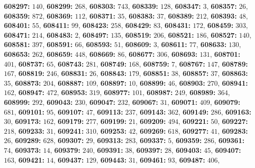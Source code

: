 \textsf{\bfseries 608297:} $140$, \textsf{\bfseries 608299:} $268$, \textsf{\bfseries 608303:} $743$, \textsf{\bfseries 608339:} $128$, \textsf{\bfseries 608347:} $3$, \textsf{\bfseries 608357:} $26$, \textsf{\bfseries 608359:} $872$, \textsf{\bfseries 608369:} $112$, \textsf{\bfseries 608371:} $35$, \textsf{\bfseries 608383:} $37$, \textsf{\bfseries 608389:} $212$, \textsf{\bfseries 608393:} $48$, \textsf{\bfseries 608401:} $55$, \textsf{\bfseries 608411:} $99$, \textsf{\bfseries 608423:} $258$, \textsf{\bfseries 608429:} $83$, \textsf{\bfseries 608431:} $172$, \textsf{\bfseries 608459:} $303$, \textsf{\bfseries 608471:} $214$, \textsf{\bfseries 608483:} $2$, \textsf{\bfseries 608497:} $135$, \textsf{\bfseries 608519:} $206$, \textsf{\bfseries 608521:} $186$, \textsf{\bfseries 608527:} $140$, \textsf{\bfseries 608581:} $397$, \textsf{\bfseries 608591:} $66$, \textsf{\bfseries 608593:} $51$, \textsf{\bfseries 608609:} $3$, \textsf{\bfseries 608611:} $77$, \textsf{\bfseries 608633:} $130$, \textsf{\bfseries 608653:} $262$, \textsf{\bfseries 608659:} $448$, \textsf{\bfseries 608669:} $86$, \textsf{\bfseries 608677:} $306$, \textsf{\bfseries 608693:} $131$, \textsf{\bfseries 608701:} $401$, \textsf{\bfseries 608737:} $65$, \textsf{\bfseries 608743:} $281$, \textsf{\bfseries 608749:} $168$, \textsf{\bfseries 608759:} $7$, \textsf{\bfseries 608767:} $147$, \textsf{\bfseries 608789:} $167$, \textsf{\bfseries 608819:} $246$, \textsf{\bfseries 608831:} $26$, \textsf{\bfseries 608843:} $179$, \textsf{\bfseries 608851:} $38$, \textsf{\bfseries 608857:} $37$, \textsf{\bfseries 608863:} $35$, \textsf{\bfseries 608873:} $204$, \textsf{\bfseries 608887:} $109$, \textsf{\bfseries 608897:} $10$, \textsf{\bfseries 608899:} $46$, \textsf{\bfseries 608903:} $270$, \textsf{\bfseries 608941:} $162$, \textsf{\bfseries 608947:} $472$, \textsf{\bfseries 608953:} $319$, \textsf{\bfseries 608977:} $101$, \textsf{\bfseries 608987:} $249$, \textsf{\bfseries 608989:} $364$, \textsf{\bfseries 608999:} $292$, \textsf{\bfseries 609043:} $230$, \textsf{\bfseries 609047:} $232$, \textsf{\bfseries 609067:} $31$, \textsf{\bfseries 609071:} $409$, \textsf{\bfseries 609079:} $681$, \textsf{\bfseries 609101:} $95$, \textsf{\bfseries 609107:} $47$, \textsf{\bfseries 609113:} $237$, \textsf{\bfseries 609143:} $362$, \textsf{\bfseries 609149:} $286$, \textsf{\bfseries 609163:} $30$, \textsf{\bfseries 609173:} $162$, \textsf{\bfseries 609179:} $277$, \textsf{\bfseries 609199:} $21$, \textsf{\bfseries 609209:} $494$, \textsf{\bfseries 609221:} $50$, \textsf{\bfseries 609227:} $218$, \textsf{\bfseries 609233:} $31$, \textsf{\bfseries 609241:} $310$, \textsf{\bfseries 609253:} $42$, \textsf{\bfseries 609269:} $618$, \textsf{\bfseries 609277:} $41$, \textsf{\bfseries 609283:} $26$, \textsf{\bfseries 609289:} $628$, \textsf{\bfseries 609307:} $29$, \textsf{\bfseries 609313:} $283$, \textsf{\bfseries 609337:} $5$, \textsf{\bfseries 609359:} $286$, \textsf{\bfseries 609361:} $74$, \textsf{\bfseries 609373:} $14$, \textsf{\bfseries 609379:} $240$, \textsf{\bfseries 609391:} $38$, \textsf{\bfseries 609397:} $28$, \textsf{\bfseries 609403:} $45$, \textsf{\bfseries 609407:} $163$, \textsf{\bfseries 609421:} $14$, \textsf{\bfseries 609437:} $129$, \textsf{\bfseries 609443:} $31$, \textsf{\bfseries 609461:} $93$, \textsf{\bfseries 609487:} $406$, 
